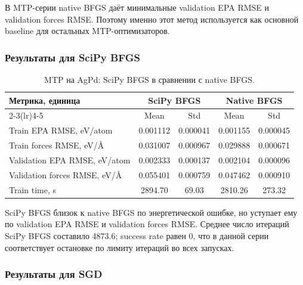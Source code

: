 
В MTP-серии native BFGS даёт минимальные validation EPA RMSE и validation forces RMSE. Поэтому именно этот метод используется как основной baseline для остальных MTP-оптимизаторов.

\FloatBarrier

\subsubsection{Результаты для SciPy BFGS}

\begin{table}[H]
\centering
\small
\caption{MTP на AgPd: SciPy BFGS в сравнении с native BFGS.}
\label{tab:mtp-scipy-bfgs}
\begin{tabular}{lcccc}
\toprule
\multirow{2}{*}{Метрика, единица} & \multicolumn{2}{c}{SciPy BFGS} & \multicolumn{2}{c}{Native BFGS} \\
\cmidrule(lr){2-3}\cmidrule(lr){4-5}
 & Mean & Std & Mean & Std \\
\midrule
Train EPA RMSE, eV/atom & 0.001112 & 0.000041 & 0.001155 & 0.000045 \\
Train forces RMSE, eV/\AA & 0.031007 & 0.000967 & 0.029888 & 0.000671 \\
Validation EPA RMSE, eV/atom & 0.002333 & 0.000137 & 0.002104 & 0.000096 \\
Validation forces RMSE, eV/\AA & 0.055401 & 0.000759 & 0.047462 & 0.000910 \\
Train time, s & 2894.70 & 69.03 & 2810.26 & 273.32 \\
\bottomrule
\end{tabular}
\end{table}


SciPy BFGS близок к native BFGS по энергетической ошибке, но уступает ему по validation EPA RMSE и validation forces RMSE. Среднее число итераций SciPy BFGS составило 4873.6; success rate равен 0, что в данной серии соответствует остановке по лимиту итераций во всех запусках.

\FloatBarrier

\subsubsection{Результаты для SGD}


